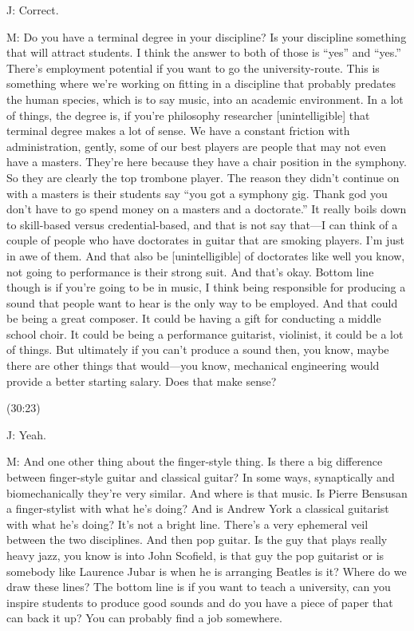 \documentclass[11pt]{article}
\begin{document}
J: Correct.

M: Do you have a terminal degree in your discipline? Is your discipline something that will attract students. I think the answer to both of those is ``yes'' and ``yes.'' There's employment potential if you want to go the university-route. This is something where we're working on fitting in a discipline that probably predates the human species, which is to say music, into an academic environment. In a lot of things, the degree is, if you're philosophy researcher [unintelligible] that terminal degree makes a lot of sense. We have a constant friction with administration, gently, some of our best players are people that may not even have a masters. They're here because they have a chair position in the symphony. So they are clearly the top trombone player. The reason they didn't continue on with a masters is their students say ``you got a symphony gig. Thank god you don't have to go spend money on a masters and a doctorate.'' It really boils down to skill-based versus credential-based, and that is not say that—I can think of a couple of people who have doctorates in guitar that are smoking players. I'm just in awe of them. And that also be [unintelligible] of doctorates like well you know, not going to performance is their strong suit. And that's okay. Bottom line though is if you're going to be in music, I think being responsible for producing a sound that people want to hear is the only way to be employed. And that could be being a great composer. It could be having a gift for conducting a middle school choir. It could be being a performance guitarist, violinist, it could be a lot of things. But ultimately if you can't produce a sound then, you know, maybe there are other things that would—you know, mechanical engineering would provide a better starting salary. Does that make sense?

(30:23)

J: Yeah. 

M: And one other thing about the finger-style thing. Is there a big difference between finger-style guitar and classical guitar? In some ways, synaptically and biomechanically they're very similar. And where is that music. Is Pierre Bensusan a finger-stylist with what he's doing? And is Andrew York a classical guitarist with what he's doing? It's not a bright line. There's a very ephemeral veil between the two disciplines. And then pop guitar. Is the guy that plays really heavy jazz, you know is into John Scofield, is that guy the pop guitarist or is somebody like Laurence Jubar is when he is arranging Beatles is it? Where do we draw these lines? The bottom line is if you want to teach a university, can you inspire students to produce good sounds and do you have a piece of paper that can back it up? You can probably find a job somewhere.
\end{document}
